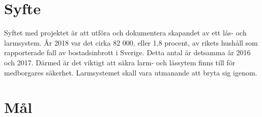 \documentclass[a4paper]{article}
\begin{document}
\section{Syfte}
\label{sec:syfte}




Syftet med projektet är att utföra och dokumentera skapandet av ett lås- och larmsystem. År 2018 var det cirka 82 000, eller 1,8 procent, av rikets hushåll som rapporterade fall av bostadsinbrott i Sverige. Detta antal är detsamma år 2016 och 2017\cite{ntu:2019}. Därmed är det viktigt att säkra larm- och låssytem finns till för medborgares säkerhet. Larmsystemet skall vara utmanande att bryta sig igenom.


\section{Mål}
\label{sec:mål}


\end{document}
